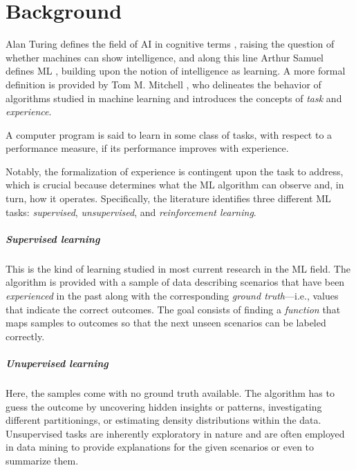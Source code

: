 \chapter{Background}
\label{chap:background}

Alan Turing defines the field of AI in cognitive terms \cite{turing1980computing}, raising the question of whether machines can show intelligence, and along this line Arthur Samuel defines ML \cite{samuel2000some}, building upon the notion of intelligence as learning.
A more formal definition is provided by Tom M. Mitchell \citep{mitchell1997machine}, who delineates the behavior of algorithms studied in machine learning and introduces the concepts of \textit{task} and \textit{experience}.
\begin{definition}
    A computer program is said to learn in some class of tasks, with respect to a performance measure, if its performance improves with experience.
\end{definition}
Notably, the formalization of experience is contingent upon the task to address, which is crucial because determines what the ML algorithm can observe and, in turn, how it operates.
Specifically, the literature identifies three different ML tasks: \textit{supervised}, \textit{unsupervised}, and \textit{reinforcement learning}.

\paragraph{Supervised learning} This is the kind of learning studied in most current research in the ML field. The algorithm is provided with a sample of data describing scenarios that have been \textit{experienced} in the past along with the corresponding \textit{ground truth}---i.e., values that indicate the correct outcomes.
The goal consists of finding a \textit{function} that maps samples to outcomes so that the next unseen scenarios can be labeled correctly.


\paragraph{Unupervised learning}
Here, the samples come with no ground truth available.
The algorithm has to guess the outcome by uncovering hidden insights or patterns, investigating different partitionings, or estimating density distributions within the data.
Unsupervised tasks are inherently exploratory in nature and are often employed in data mining to provide explanations for the given scenarios or even to summarize them.

